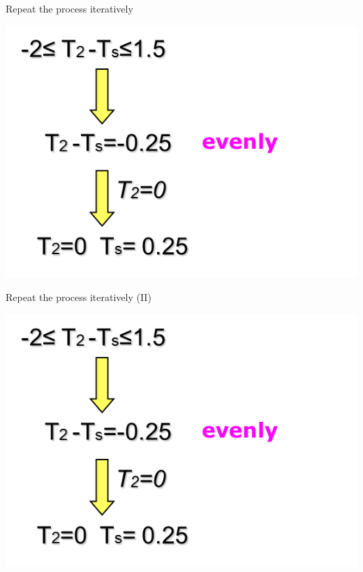 \documentclass[
  ignorenonframetext,
]{beamer}
\begin{document}
\begin{frame}{Repeat the process iteratively}
\protect\hypertarget{repeat-the-process-iteratively}{}
\columnsbegin
{}

\pause
{}

\includegraphics{lec05.files/fig15.png}\\
\columnsend
\end{frame}

\begin{frame}{Repeat the process iteratively (II)}
\protect\hypertarget{repeat-the-process-iteratively-ii}{}
\columnsbegin
{}


\includegraphics{lec05.files/fig15.png}\\
\columnsend
\end{frame}
\end{document}
